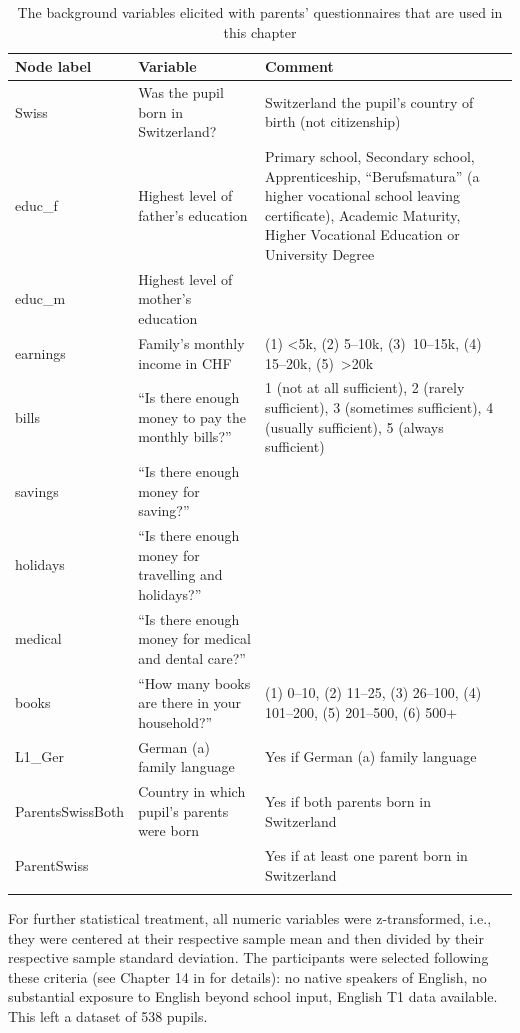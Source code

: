 \documentclass[output=paper]{langsci/langscibook}
\begin{document}
\begin{table}
\caption{The background variables elicited with parents’ questionnaires that are used in this chapter\label{tab:05:1}}
\begin{tabularx}{\textwidth}{lQQ}
\lsptoprule
{Node label} & {Variable} & {Comment}\\\midrule
Swiss & Was the pupil born in Switzerland? & Switzerland the pupil’s country of birth (not citizenship)\\
educ\_f & Highest level of father’s education & Primary school, Secondary school, Apprenticeship, “Berufsmatura” (a higher vocational school leaving certificate),  Academic Maturity, Higher Vocational Education or University Degree\\
educ\_m & Highest level of mother’s education & \\
earnings & Family’s monthly income in CHF & (1) <5k, (2) 5--10k, (3)~10--15k, (4) 15--20k, (5)~>20k\\
bills & “Is there enough money to pay the monthly bills?” & 1 (not at all sufficient), 2 (rarely sufficient), 3 (sometimes sufficient), 4 (usually sufficient), 5 (always sufficient)\\
savings & “Is there enough money for saving?” & \\
holidays & “Is there enough money for travelling and holidays?” & \\
medical & “Is there enough money for medical and dental care?” & \\
books & “How many books are there in your household?” & (1) 0--10, (2) 11--25, (3) 26--100, (4) 101--200, (5) 201--500, (6) 500+\\
L1\_Ger & German (a) family language & Yes if German (a) family language\\
ParentsSwissBoth & Country in which pupil’s parents were born & Yes if both parents born in Switzerland\\
ParentSwiss &  & Yes if at least one parent born in Switzerland\\
\lspbottomrule
\end{tabularx}
\end{table}

For further statistical treatment, all numeric variables were z-transformed, i.e., they were centered at their respective sample mean and then divided by their respective sample standard deviation. The participants were selected following these criteria (see Chapter 14 in \citealt{Vanhove2021} for details): no native speakers of English, no substantial exposure to English beyond school input, English T1 data available. This left a dataset of 538 pupils.
\end{document}
